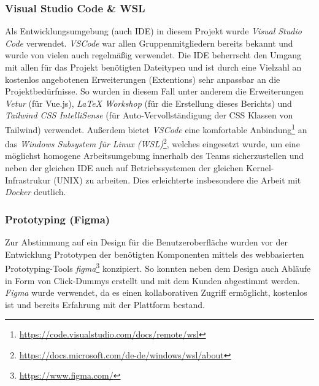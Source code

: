 \documentclass[10pt, a4paper]{article}
\begin{document}
\begin{onehalfspace}
      \subsubsection{Visual Studio Code \& WSL}
      Als Entwicklungsumgebung (auch IDE) in diesem Projekt wurde \textit{Visual Studio Code} verwendet. \textit{VSCode} war allen Gruppenmitgliedern bereits bekannt und wurde von vielen auch regelmäßig verwendet.
      Die IDE beherrscht den Umgang mit allen für das Projekt benötigten Dateitypen und ist durch eine Vielzahl an kostenlos angebotenen Erweiterungen (Extentions) sehr anpassbar an die Projektbedürfnisse.
      So wurden in diesem Fall unter anderem die Erweiterungen \textit{Vetur} (für Vue.js), \textit{LaTeX Workshop}  (für die Erstellung dieses Berichts) und \textit{Tailwind CSS IntelliSense} (für Auto-Vervollständigung der CSS Klassen von Tailwind) verwendet.
      Außerdem bietet \textit{VSCode} eine komfortable Anbindung\footnote{\raggedright\url{https://code.visualstudio.com/docs/remote/wsl}} an das
      \textit{Windows Subsystem für Linux (WSL)}\footnote{\raggedright\url{https://docs.microsoft.com/de-de/windows/wsl/about}}, welches eingesetzt wurde, um eine möglichst homogene Arbeitsumgebung innerhalb des Teams sicherzustellen
      und neben der gleichen IDE auch auf Betriebssystemen der gleichen Kernel-Infrastrukur (UNIX) zu arbeiten. Dies erleichterte insbesondere die Arbeit mit \textit{Docker} deutlich.

      \subsubsection{Prototyping (Figma)}
      \label{figma}
      Zur Abstimmung auf ein Design für die Benutzer\-oberfläche wurden vor der Entwicklung Proto\-typen der benötigten Komponenten mittels des webbasierten
      Prototyping-Tools \textit{figma}\footnote{\url{https://www.figma.com/}} konzipiert. So konnten neben dem Design auch Abläufe in Form von \glqq Click-Dummys\grqq{} erstellt und mit dem Kunden abgestimmt werden.
      \textit{Figma} wurde verwendet, da es einen kollaborativen Zugriff ermöglicht, kostenlos ist und bereits Erfahrung mit der Plattform bestand.


\end{onehalfspace}
\end{document}
